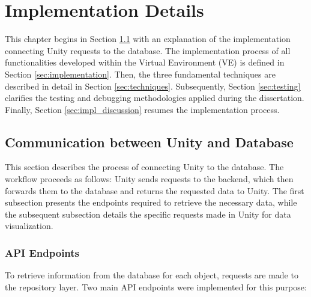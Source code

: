 
%
\chapter{Implementation Details}
\label{cha:system_implementation}
This chapter begins in Section \ref{sec:communication} with an explanation of the implementation connecting Unity requests to the database.
The implementation process of all functionalities developed within the Virtual Environment (\gls{VE}) is defined in Section \ref{sec:implementation}.
Then, the three fundamental techniques are described in detail in Section \ref{sec:techniques}.
Subsequently, Section \ref{sec:testing} clarifies the testing and debugging methodologies applied during the dissertation.
Finally, Section \ref{sec:impl_discussion} resumes the implementation process.

\section{Communication between Unity and Database}
\label{sec:communication}
This section describes the process of connecting Unity to the database. 
The workflow proceeds as follows: Unity sends requests to the backend, which then forwards them to the database and returns the requested data to Unity. 
The first subsection presents the endpoints required to retrieve the necessary data, while the subsequent subsection details the specific requests made in Unity for data visualization.

\subsection{\gls{API} Endpoints}

To retrieve information from the database for each object, requests are made to the repository layer. 
Two main \gls{API} endpoints were implemented for this purpose:

